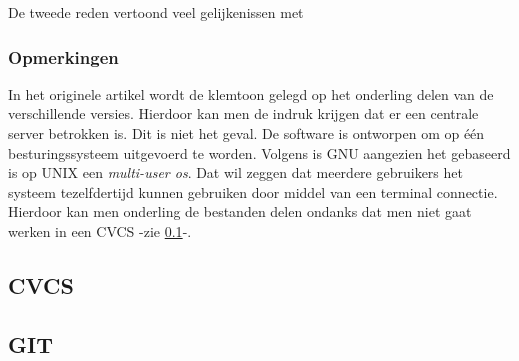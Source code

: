 De tweede reden vertoond veel gelijkenissen met 
\subsubsection{Opmerkingen}
In het originele artikel wordt de klemtoon gelegd op het onderling delen van de verschillende versies. Hierdoor kan men de indruk krijgen dat er een centrale server betrokken is. Dit is niet het geval. De software is ontworpen om op één besturingssysteem uitgevoerd te worden. Volgens \textcite{Debian2020} is GNU aangezien het gebaseerd is op UNIX een \textit{multi-user os}. Dat wil zeggen dat meerdere gebruikers het systeem tezelfdertijd kunnen gebruiken door middel van een terminal connectie. Hierdoor kan men onderling de bestanden delen ondanks dat men niet gaat werken in een CVCS -zie \ref{sec:CVCS}-.

\subsection{CVCS}
\label{sec:CVCS}

\subsection{GIT}
\label{sec:GIT}
